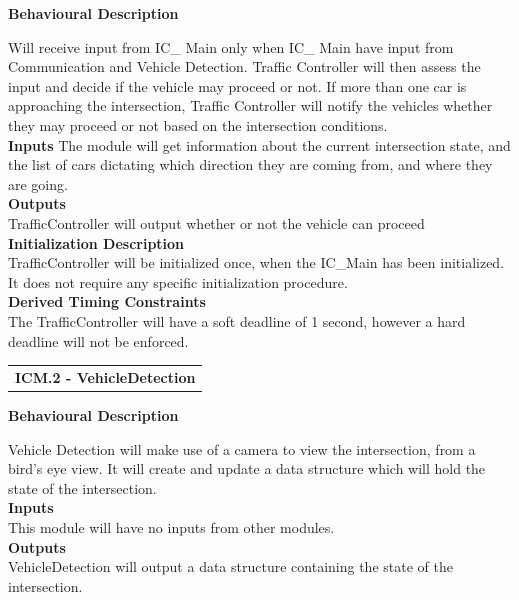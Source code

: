 \documentclass [10pt]{article}
\begin{document}
\textbf{Behavioural Description} 

Will receive input from IC\_ Main only when IC\_ Main have input from Communication and Vehicle Detection. Traffic Controller will then assess the input and decide if the vehicle may proceed or not. If more than one car is approaching the intersection, Traffic Controller will notify the vehicles whether they may proceed or not based on the intersection conditions.  \\

\textbf{Inputs}
The module will get information about the current intersection state, and the list of cars dictating which direction they are coming from, and where they are going. \\


\textbf{Outputs} \\
TrafficController will output whether or not the vehicle can proceed 
 \\

\textbf{Initialization Description} \\
 TrafficController will be initialized once, when the IC\_Main has been initialized. It does not require any specific initialization procedure.\\

\textbf{Derived Timing Constraints} \\
    The TrafficController will have a soft deadline of 1 second, however a hard deadline will not be enforced.
 \\


\begin{longtable}{p{}}
\rowcolor{tableCell}\textbf{ICM.2 - VehicleDetection} \\
\end{longtable}

\textbf{Behavioural Description} 

Vehicle Detection will make use of a camera to view the intersection, from a bird's eye view. It will create and update a data structure which will hold the state of the intersection.  \\

\textbf{Inputs} \\
This module will have no inputs from other modules.  \\

\textbf{Outputs} \\
VehicleDetection will output a data structure containing the state of the intersection.  \\
\end{document}

